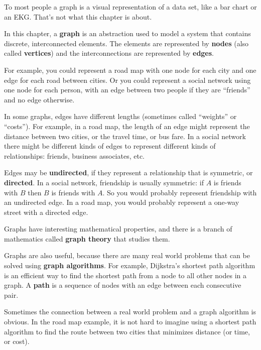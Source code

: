 \documentclass[10pt]{book}
\begin{document}
To most people a graph is a visual representation of a data set, like
a bar chart or an EKG.  That's not what this chapter is about.

In this chapter, a {\bf graph} is an abstraction used to
model a system that contains discrete, interconnected elements.  The
elements are represented by {\bf nodes} (also called {\bf vertices})
and the interconnections are represented by {\bf edges}.

For example, you could represent a road map with one node for each
city and one edge for each road between cities.  Or you could
represent a social network using one node for each person, with an
edge between two people if they are ``friends'' and no edge otherwise.

In some graphs, edges have different lengths (sometimes
called ``weights'' or ``costs'').  For example, in a road map, the
length of an edge might represent the distance between
two cities, or the travel time, or bus fare.
In a social network there might be different kinds of
edges to represent different kinds of relationships: friends,
business associates, etc.

Edges may be {\bf undirected}, if they represent a relationship
that is symmetric, or {\bf directed}.  In a social network,
friendship is usually symmetric: if $A$ is friends with $B$ then
$B$ is friends with $A$.  So you would probably represent friendship
with an undirected edge.  In a road map, you would probably represent
a one-way street with a directed edge.

Graphs have interesting mathematical properties, and
there is a branch of mathematics called {\bf graph theory}
that studies them.

Graphs are also useful, because there are many real world
problems that can be solved using {\bf graph algorithms}.
For example, Dijkstra's shortest path algorithm is an efficient
way to find the shortest path from a node to all
other nodes in a graph.  A {\bf path} is a sequence of nodes
with an edge between each consecutive pair.

Sometimes the connection between a real world problem and
a graph algorithm is obvious.  In the road map example, it is
not hard to imagine using a shortest path algorithm to find
the route between two cities that minimizes distance (or time,
or cost).
\end{document}
